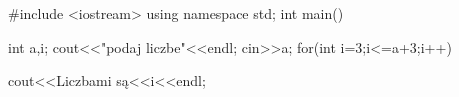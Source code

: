#include <iostream>
using namespace std;
int main()
{
int a,i;
 cout<<"podaj liczbe"<<endl;
 cin>>a;
 for(int i=3;i<=a+3;i++)

 cout<<Liczbami są<<i<<endl;
 
}